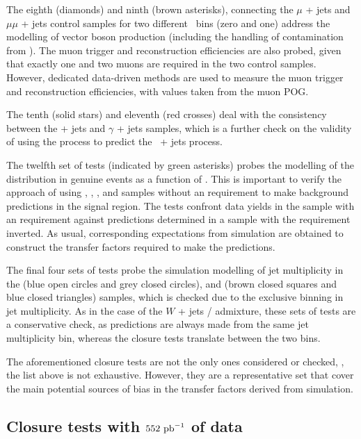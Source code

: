 The eighth (diamonds) and ninth (brown asterisks), connecting the $\mu$
+ jets and $\mu\mu$ + jets control samples for two different \nb~bins
(zero and one) address the modelling of vector boson production
(including the handling of contamination from \ttbar). The muon
trigger and reconstruction efficiencies are also probed, given that
exactly one and two muons are required in the two control
samples. However, dedicated data-driven methods are used to measure
the muon trigger and reconstruction efficiencies, with values taken
from the muon POG.

The tenth (solid stars) and eleventh (red crosses) deal with the
consistency between the \zee + jets and $\gamma$ + jets
samples, which is a further check on the validity of using the \gj
process to predict the \znunu\, + jets process.

The twelfth set of tests (indicated by green asterisks) probes the
modelling of the \alphat distribution in genuine \met events as a
function of \scalht. This is important to verify the approach of using
\mj, \ej, \mmj, and \eej samples without an \alphat requirement to
make background predictions in the signal region. The tests confront
data yields in the \mj sample with an \alphat requirement against
predictions determined in a \mj sample with the \alphat requirement
inverted. As usual, corresponding expectations from simulation are
obtained to construct the transfer factors required to make the
predictions.

The final four sets of tests probe the simulation modelling of jet
multiplicity in the \ej (blue open circles and grey closed circles),
and \eej (brown closed squares and blue closed triangles) samples,
which is checked due to the exclusive binning in jet multiplicity.  As
in the case of the $W$ + jets / \ttbar admixture, these sets of tests
are a conservative check, as predictions are always made from the same
jet multiplicity bin, whereas the closure tests translate between the
two bins.

The aforementioned closure tests are not the only ones considered or
checked, \ie, the list above is not exhaustive. However, they are a
representative set that cover the main potential sources of bias in
the transfer factors derived from simulation. 

\subsection{Closure tests with $552~\ipb$ of data}
\label{sec:closure-data-study}

